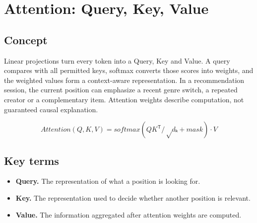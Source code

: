 \section{Attention: Query, Key, Value}

\begin{abstract}
Each position asks which earlier events are useful for interpreting the current one.
\end{abstract}

\subsection{Concept}
Linear projections turn every token into a Query, Key and Value. A query compares with all permitted keys, softmax converts those scores into weights, and the weighted values form a context-aware representation. In a recommendation session, the current position can emphasize a recent genre switch, a repeated creator or a complementary item. Attention weights describe computation, not guaranteed causal explanation.

\begin{equation*}
Attention(Q,K,V) = softmax(QK^{\mathsf T} / √dₖ + mask) \cdot V
\end{equation*}

\subsection{Key terms}
\begin{itemize}
\item \textbf{Query.} The representation of what a position is looking for.
\item \textbf{Key.} The representation used to decide whether another position is relevant.
\item \textbf{Value.} The information aggregated after attention weights are computed.
\end{itemize}

